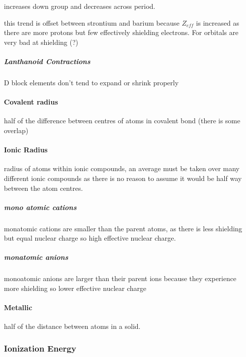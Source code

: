 \documentclass[]{article}
\let\oldparagraph\paragraph
\renewcommand{\paragraph}[1]{\oldparagraph{#1}\mbox{}}
\let\oldsubparagraph\subparagraph
\renewcommand{\subparagraph}[1]{\oldsubparagraph{#1}\mbox{}}
\begin{document}
increases down group and decreases across period.

this trend is offset between strontium and barium because \(Z_{eff}\) is
increased as there are more protons but few effectively shielding
electrons. For orbitals are very bad at shielding (?)

\hypertarget{lanthanoid-contractions}{%
\subparagraph{Lanthanoid Contractions}\label{lanthanoid-contractions}}

D block elements don't tend to expand or shrink properly

\hypertarget{covalent-radius}{%
\paragraph{Covalent radius}\label{covalent-radius}}

half of the difference between centres of atoms in covalent bond (there
is some overlap)

\hypertarget{ionic-radius}{%
\paragraph{Ionic Radius}\label{ionic-radius}}

radius of atoms within ionic compounds, an average must be taken over
many different ionic compounds as there is no reason to assume it would
be half way between the atom centres.

\hypertarget{mono-atomic-cations}{%
\subparagraph{mono atomic cations}\label{mono-atomic-cations}}

monatomic cations are smaller than the parent atoms, as there is less
shielding but equal nuclear charge so high effective nuclear charge.

\hypertarget{monatomic-anions}{%
\subparagraph{monatomic anions}\label{monatomic-anions}}

monoatomic anions are larger than their parent ions because they
experience more shielding so lower effective nuclear charge

\hypertarget{metallic}{%
\paragraph{Metallic}\label{metallic}}

half of the distance between atoms in a solid.

\hypertarget{ionization-energy}{%
\subsubsection{Ionization Energy}\label{ionization-energy}}
\end{document}
